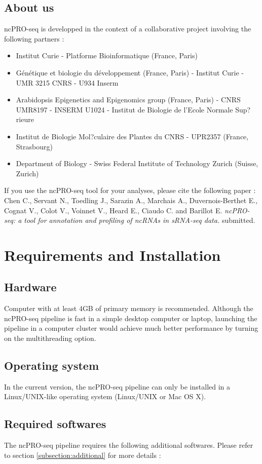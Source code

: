 \documentclass[12pt]{article}
\def \ncpip{ncPRO-seq}
\begin{document}
\subsection{About us}
\ncpip{} is developped in the context of a collaborative project involving the following partners :
\begin{itemize}
\item Institut Curie - Platforme Bioinformatique (France, Paris)
\item G\'en\'etique et biologie du d\'eveloppement (France, Paris) - Institut Curie - UMR 3215 CNRS - U934 Inserm 
\item Arabidopsis Epigenetics and Epigenomics group (France, Paris) - CNRS UMR8197 - INSERM U1024 - Institut de Biologie de l'Ecole Normale Sup?rieure 
\item Institut de Biologie Mol?culaire des Plantes du CNRS - UPR2357 (France, Strasbourg)  
\item Department of Biology - Swiss Federal Institute of Technology Zurich (Suisse, Zurich)  
\end{itemize}

\noindent If you use the ncPRO-seq tool for your analyses, please cite the following paper :\\
Chen C., Servant N., Toedling J., Sarazin A., Marchais A., Duvernois-Berthet E., Cognat V., Colot V., Voinnet V., Heard E., Ciaudo C. and Barillot E. \textit{ncPRO-seq: a tool for annotation and profiling of ncRNAs in sRNA-seq data.} submitted. 


\section{Requirements and Installation}
\subsection{Hardware}
Computer with at least 4GB of primary memory is recommended. Although the \ncpip{} pipeline is fast in a simple desktop computer or laptop, launching the pipeline in a computer cluster would achieve much better performance by turning on the multithreading option.
\subsection{Operating system}
In the current version, the \ncpip{} pipeline can only be installed in a Linux/UNIX-like operating system (Linux/UNIX or Mac OS X).
\subsection{Required softwares}
\label{subsection:prerequired}
The \ncpip{} pipeline requires the following additional softwares. Please refer to section \ref{subsection:additional} for more details :
\end{document}
